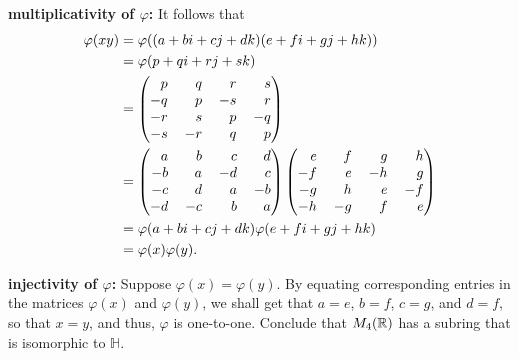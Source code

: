 \begin{enumerate}
      \textbf{multiplicativity of $\varphi$:} It follows that
      \begin{align*}
         \varphi(xy) &= \varphi((a + bi + cj + dk)(e + fi + gj + hk)) \\
            &= \varphi(p + qi + rj + sk) \\
            &= \left(\begin{tabular}{@{}rrrr@{}}
               $p$  & $q$  & $r$  & $s$ \\
               $-q$ & $p$  & $-s$ & $r$ \\
               $-r$ & $s$  & $p$  & $-q$ \\
               $-s$ & $-r$ & $q$  & $p$
            \end{tabular}\right) \\
            &= \left(\begin{tabular}{@{}rrrr@{}}
               $a$  & $b$  & $c$  & $d$ \\
               $-b$ & $a$  & $-d$ & $c$ \\
               $-c$ & $d$  & $a$  & $-b$ \\
               $-d$ & $-c$ & $b$  & $a$
            \end{tabular}\right)\left(\begin{tabular}{@{}rrrr@{}}
               $e$  & $f$  & $g$  & $h$ \\
               $-f$ & $e$  & $-h$ & $g$ \\
               $-g$ & $h$  & $e$  & $-f$ \\
               $-h$ & $-g$ & $f$  & $e$
            \end{tabular}\right) \\
            &= \varphi(a + bi + cj + dk)\varphi(e + fi + gj + hk) \\
            &= \varphi(x)\varphi(y).
      \end{align*}

      \textbf{injectivity of $\varphi$:} Suppose $\varphi(x) = \varphi(y)$. By 
      equating corresponding entries in the matrices $\varphi(x)$ and
      $\varphi(y)$, we shall get that $a = e$, $b = f$, $c = g$, and $d = f$, so 
      that $x = y$, and thus, $\varphi$ is one-to-one. Conclude that $M_4(\mathbb{R})$
      has a subring that is isomorphic to $\mathbb{H}$.


\end{enumerate}
